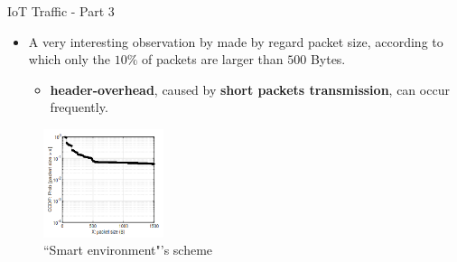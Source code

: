 \documentclass[10pt]{beamer}
\begin{document}
\begin{frame}{IoT Traffic - Part 3}

\begin{itemize}
\justifying
\item A very interesting observation by \citet{ITPAReport} made by regard packet size, according to which only the $10\%$ of packets are larger than $500$ Bytes.

\begin{itemize}
\item \textbf{header-overhead}, caused by \textbf{short packets transmission}, can occur frequently.
\end{itemize}

\end{itemize}

\begin{figure}
  \caption{``Smart environment"'s scheme}
  \includegraphics[width=100pt]{PacketSize.png}
\end{figure}

\end{frame} 
\end{document}
